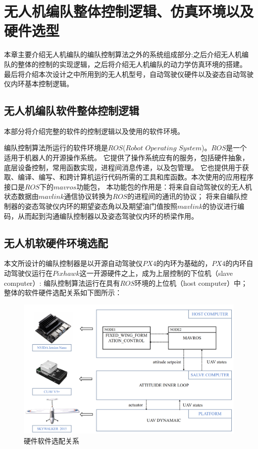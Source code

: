 \chapter{无人机编队整体控制逻辑、仿真环境以及硬件选型}
\label{chap:hardware}
本章主要介绍无人机编队的编队控制算法之外的系统组成部分;之后介绍无人机编队的整体的控制的实现逻辑，之后将介绍无人机编队的动力学仿真环境的搭建。
最后将介绍本次设计之中所用到的无人机型号，自动驾驶仪硬件以及姿态自动驾驶仪内环基本控制逻辑。
\section{无人机编队软件整体控制逻辑}
本部分将介绍完整的软件的控制逻辑以及使用的软件环境。

编队控制算法所运行的软件环境是$ROS$($Robot$ $Operating$ $System$)。$ROS$是一个适用于机器人的开源操作系统。
它提供了操作系统应有的服务，包括硬件抽象，底层设备控制，常用函数实现，进程间消息传递，以及包管理。
它也提供用于获取、编译、编写、和跨计算机运行代码所需的工具和库函数。本次使用的应用程序接口是$ROS$下的$mavros$功能包，
本功能包的作用是：将来自自动驾驶仪的无人机状态数据由$mavlink$通信协议转换为$ROS$的进程间的通讯的协议；
将来自编队控制器的姿态驾驶仪内环的期望姿态角以及期望油门值按照$mavlink$的协议进行编码，从而起到沟通编队控制器以及姿态驾驶仪内环的桥梁作用。
\section{无人机软硬件环境选配}
本文所设计的编队控制器是以开源自动驾驶仪$PX4$的内环为基础的，$PX4$的内环自动驾驶仪运行在$Pixhawk$这一开源硬件之上，成为上层控制的下位机（slave computer）:
编队控制算法运行在具有$ROS$环境的上位机（host computer）中；
整体的软件硬件选配关系如下图所示：
\begin{figure}[H]
    \centering
    \includegraphics[width=1\textwidth]{figures/c4/c4-soft-hard.png}
    \caption{硬件软件选配关系}\label{fig:c4-soft-hard.png}
\end{figure}

